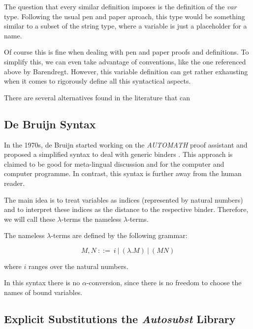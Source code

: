 The question that every similar definition imposes is the definition of the $var$ type. Following the usual pen and paper aproach, this type would be something similar to a subset of the string type, where a variable is just a placeholder for a name.

Of course this is fine when dealing with pen and paper proofs and definitions. To simplify this, we can even take advantage of conventions, like the one referenced above by Barendregt. However, this variable definition can get rather exhausting  when it comes to rigorously define all this syntactical aspects.

There are several alternatives found in the literature that can 


\subsection{De Bruijn Syntax}

In the 1970s, de Bruijn started working on the \textit{AUTOMATH} proof assistant and proposed a simplified syntax to deal with generic binders \cite{deBruijn}.
This approach is claimed to be good for meta-lingual discussion and for the computer and computer programme. In contrast, this syntax is further away from the human reader.

The main idea is to treat variables as indices (represented by natural numbers) and to interpret these indices as the distance to the respective binder.
Therefore, we will call these $\lambda$-terms the nameless $\lambda$-terms.

\begin{definition}
  The nameless $\lambda$-terms are defined by the following grammar:

  \[ M, N \ ::= \ i \ | \ (\lambda . M) \ | \ (M N) \]

  where $i$ ranges over the natural numbers.
\end{definition}

\begin{remark}
	In this syntax there is no $\alpha$-conversion, since there is no freedom to choose the names of bound variables.
\end{remark}

\subsection{Explicit Substitutions the \textit{Autosubst} Library}



